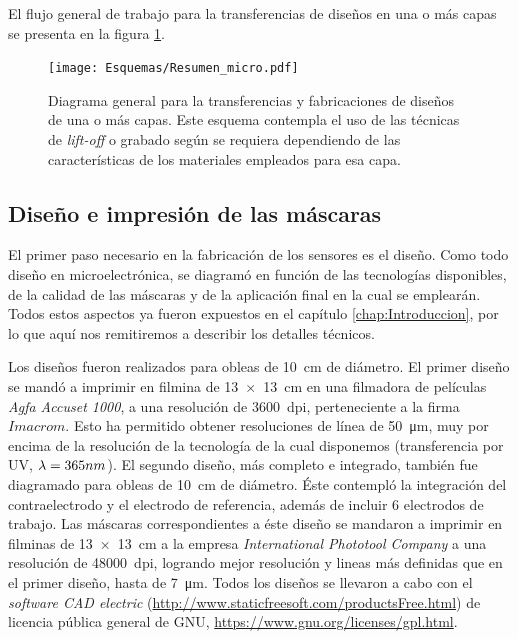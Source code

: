 	 El flujo general de trabajo para la transferencias de diseños en una o más capas se presenta en la figura \ref{esq:micro}.
			
			 \begin{figure}[h!]
			  \begin{center}
			  \texttt{[image: Esquemas/Resumen\_micro.pdf]}
			  \caption[Esquema para la transferencia de los diseños]{Diagrama general para la transferencias y fabricaciones de diseños de una o más capas. Este esquema contempla el uso de las técnicas de \textit{lift-off }o grabado según se requiera dependiendo de las características de los materiales empleados para esa capa.}
			  \label{esq:micro}
			  \end{center}
			  \end{figure}

	\subsection{Diseño e impresión de las máscaras}\label{sec:impresion_mascaras}

		El primer paso necesario en la fabricación de los sensores es el diseño. Como todo diseño en microelectrónica, se diagramó en función de las tecnologías disponibles, de la calidad de las máscaras y de la aplicación final en la cual se emplearán. Todos estos aspectos ya fueron expuestos en el capítulo \ref{chap:Introduccion}, por lo que aquí nos remitiremos a describir los detalles técnicos.

		Los diseños fueron realizados para obleas de \SI{10}{\cm} de diámetro. El primer diseño se mandó a imprimir en filmina de \SI{13x13}{\cm} en una filmadora de películas \textit{Agfa Accuset 1000}, a una resolución de \SI{3600}{dpi}, perteneciente a la firma $Imacrom$. Esto ha permitido obtener resoluciones de línea de \SI{50}{\um}, muy por encima de la resolución de la tecnología de la cual disponemos (transferencia por UV, $\lambda\index{longitud de onda}=365nm$). El segundo diseño, más completo e integrado, también fue diagramado para obleas de \SI{10}{\cm} de diámetro. Éste contempló la integración del contraelectrodo y el electrodo de referencia, además de incluir 6 electrodos de trabajo. Las máscaras correspondientes a éste diseño se mandaron a imprimir en filminas de \SI{13x13}{\cm} a la empresa \textit{International Phototool Company} a una resolución de \SI{48000}{dpi}, logrando mejor resolución y lineas más definidas que en el primer diseño, hasta de \SI{7}{\um}. Todos los diseños se llevaron a cabo con el \textit{software CAD electric} (\url{http://www.staticfreesoft.com/productsFree.html}) de licencia pública general de GNU, \url{https://www.gnu.org/licenses/gpl.html}. 
				
